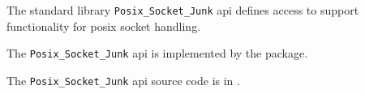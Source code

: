 
The standard library {\tt Posix\_Socket\_Junk} api defines access to support functionality for posix socket handling.

The {\tt Posix\_Socket\_Junk} api is implemented by the  package.

The {\tt Posix\_Socket\_Junk} api source code is in .
